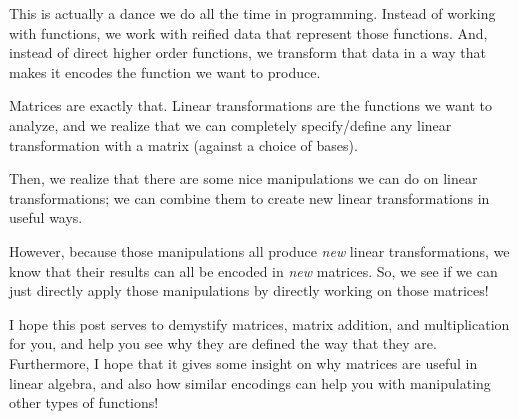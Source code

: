 \documentclass[]{article}
\begin{document}
This is actually a dance we do all the time in programming. Instead of working
with functions, we work with reified data that represent those functions. And,
instead of direct higher order functions, we transform that data in a way that
makes it encodes the function we want to produce.

Matrices are exactly that. Linear transformations are the functions we want to
analyze, and we realize that we can completely specify/define any linear
transformation with a matrix (against a choice of bases).

Then, we realize that there are some nice manipulations we can do on linear
transformations; we can combine them to create new linear transformations in
useful ways.

However, because those manipulations all produce \emph{new} linear
transformations, we know that their results can all be encoded in \emph{new}
matrices. So, we see if we can just directly apply those manipulations by
directly working on those matrices!

I hope this post serves to demystify matrices, matrix addition, and
multiplication for you, and help you see why they are defined the way that they
are. Furthermore, I hope that it gives some insight on why matrices are useful
in linear algebra, and also how similar encodings can help you with manipulating
other types of functions!
\end{document}

